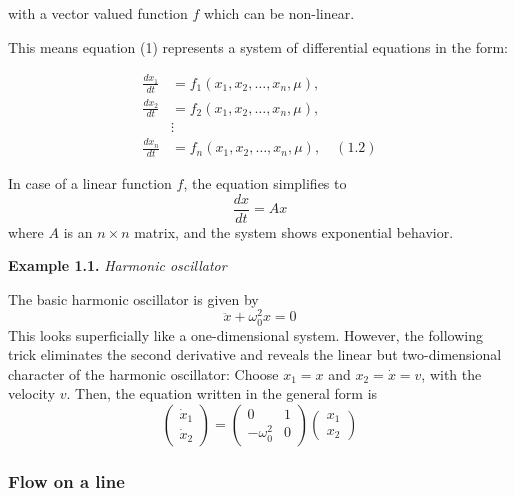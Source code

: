 \documentclass[17pt]{extarticle}
\begin{document}
with a vector valued function \(f\) which can be non-linear. 

This means equation (1) represents a system of differential equations in the form:

$$
\begin{aligned}
\frac{dx_1}{dt} &= f_1(x_1, x_2, \ldots, x_n, \mu), \\
\frac{dx_2}{dt} &= f_2(x_1, x_2, \ldots, x_n, \mu), \\
&\vdots \quad \quad \quad   \\
\frac{dx_n}{dt} &= f_n(x_1, x_2, \ldots, x_n, \mu), \quad (\text{1.2})
\end{aligned}
$$

\newpage 
In case of a linear function \(f\), the equation simplifies to
\begin{equation} \label{eq:linear}
    \frac{dx}{dt} = Ax \tag{1.3}
\end{equation}
where \(A\) is an \(n \times n\) matrix, and the system shows exponential behavior.

\noindent \textbf{Example 1.1.} \textit{Harmonic oscillator}

The basic harmonic oscillator is given by
\begin{equation} \label{eq:harmonic_oscillator}
    \ddot{x} + \omega^2_0 x = 0 \tag{1.4}
\end{equation}
This looks superficially like a one-dimensional system. However, the following trick eliminates the second derivative and reveals the linear but two-dimensional character of the harmonic oscillator: Choose \(x_1 = x\) and \(x_2 = \dot{x} = v\), with the velocity \(v\). Then, the equation written in the general form is
\begin{equation} \label{eq:matrix_form}
    \begin{pmatrix}
        \dot{x}_1 \\
        \dot{x}_2
    \end{pmatrix} = 
    \begin{pmatrix}
        0 & 1 \\
        -\omega^2_0 & 0
    \end{pmatrix}
    \begin{pmatrix}
        x_1 \\
        x_2
    \end{pmatrix} \tag{1.5}
\end{equation}

\subsubsection{Flow on a line}
\end{document}

